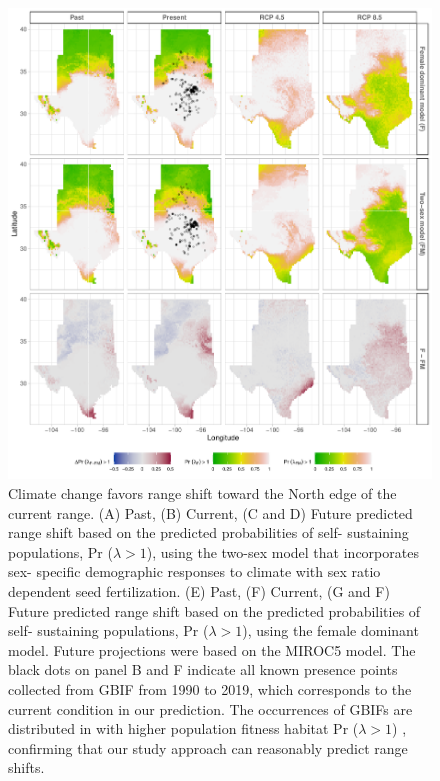 \documentclass[12pt]{article}\usepackage[]{graphicx}\usepackage[dvipsnames]{xcolor}
\begin{document}
\begin{figure}[H]
	\begin{center}
		\includegraphics[width=0.95\linewidth]{Figures/Fig_geoPrlambda_miroc.pdf}
		\caption{Climate change favors range shift toward the North edge of the current range.
			(A) Past, (B) Current, (C and D) Future predicted range shift based on the predicted probabilities of self- sustaining populations, Pr ($\lambda > 1$), using the two-sex model that incorporates sex- specific demographic responses to climate with sex ratio dependent seed fertilization.
			(E) Past, (F) Current, (G and F) Future  predicted range shift based on the predicted probabilities of self- sustaining populations, Pr ($\lambda > 1$), using the female dominant model.
			Future projections were based on the MIROC5 model.
			The black dots on panel B and F indicate all known presence points collected from GBIF from 1990 to 2019, which corresponds to the current condition in our prediction. 
			The occurrences of GBIFs are distributed in with higher population fitness habitat Pr ($\lambda > 1$) , confirming that our study approach can reasonably predict range shifts.}
		\label{Sup:geoprojmiroc}
	\end{center}
\end{figure}
\end{document}
